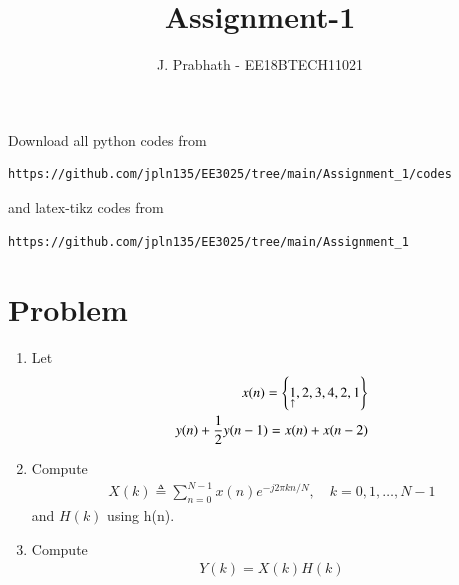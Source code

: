 \documentclass[journal,12pt,twocolumn]{IEEEtran}
\renewcommand\thesection{\arabic{section}}
\begin{document}
     \def\rightbox#1{\makebox[0in][r]{#1}}
     \def\centbox#1{\makebox[0in]{#1}}
     \def\topbox#1{\raisebox{-\baselineskip}[0in][0in]{#1}}
     \def\midbox#1{\raisebox{-0.5\baselineskip}[0in][0in]{#1}}
\vspace{3cm}
\title{Assignment-1}
\author{J. Prabhath - EE18BTECH11021}
\maketitle
\newpage
\bigskip
\renewcommand{\thefigure}{\theenumi}
\renewcommand{\thetable}{\theenumi}
Download all python codes from 
\begin{lstlisting}
https://github.com/jpln135/EE3025/tree/main/Assignment_1/codes
\end{lstlisting}
%
and latex-tikz codes from 
%
\begin{lstlisting}
https://github.com/jpln135/EE3025/tree/main/Assignment_1
\end{lstlisting}

\section{Problem}
\begin{enumerate}[label=\thesection.\arabic*.,ref=\thesection.\theenumi]
    
    \item Let
    \begin{align}
        x(n) = \cbrak{\underset{\uparrow}{1},2,3,4,2,1}
         \label{eq:equation0}\\
        y(n) + \frac{1}{2}y(n-1) = x(n) + x(n-2)	
        \label{eq:equation1}
    \end{align}
    
    \item Compute 
    \begin{align}
        X(k) \triangleq \sum_{n=0}^{N-1} x(n) e^{-j 2 \pi k n / N}, \quad k=0,1, \ldots, N-1
    \end{align}
    and $H(k)$ using h(n).
    
    \item Compute 
    \begin{align}
    Y(k) = X(k)H(k)
    \end{align}
\end{enumerate}
\end{document}
